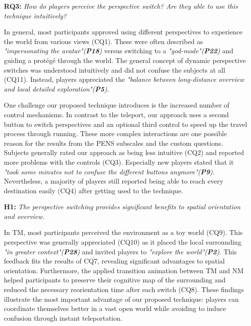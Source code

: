 \documentclass{sigchi}
\begin{document}
\textbf{RQ3:} \textit{How do players perceive the perspective switch? Are they able to use this technique intuitively? }\par
In general, most participants approved using different perspectives to experience the world from various views (CQ1). These were often described as \textit{"impersonating the avatar"(\textbf{P18})} versus switching to a \textit{"god-mode"(\textbf{P22})} and guiding a prot\'{e}g\'{e} through the world. The general concept of dynamic perspective switches was understood intuitively and did not confuse the subjects at all (CQ11). Instead, players appreciated the \textit{"balance between long-distance overview and local detailed exploration"(\textbf{P5})}.\par
One challenge our proposed technique introduces is the increased number of control mechanisms. In contrast to the teleport, our approach uses a second button to switch perspectives and an optional third control to speed up the travel process through running. These more complex interactions are one possible reason for the results from the PENS subscales and the custom questions. Subjects generally rated our approach as being less intuitive (CQ2) and reported more problems with the controls (CQ3). Especially new players stated that it \textit{"took some minutes not to confuse the different buttons anymore"(\textbf{P9})}. Nevertheless, a majority of players still reported being able to reach every destination easily (CQ4) after getting used to the technique.\par

\textbf{H1:} \textit{The perspective switching provides significant benefits to spatial orientation and overview.}\par
In TM, most participants perceived the environment as a toy world (CQ9). This perspective was generally appreciated (CQ10) as it placed the local surrounding \textit{"in greater context"(\textbf{P28})} and invited players to \textit{"explore the world"(\textbf{P2})}. This feedback fits the results of CQ7, revealing significant advantages to spatial orientation. Furthermore, the applied transition animation between TM and NM helped participants to preserve their cognitive map of the surrounding and reduced the necessary reorientation time after each switch (CQ8). These findings illustrate the most important advantage of our proposed technique: players can coordinate themselves better in a vast open world while avoiding to induce confusion through instant teleportation.
\end{document}
